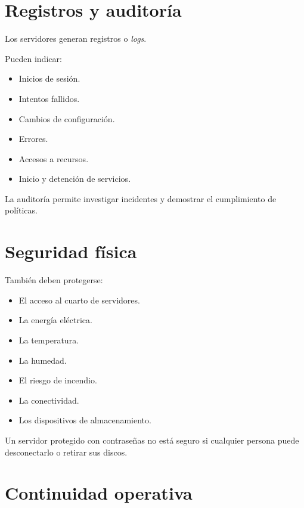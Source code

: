 \documentclass[
  spanish,
  letterpaper,
]{scrbook}
\providecommand{\tightlist}{%
  \setlength{\itemsep}{0pt}\setlength{\parskip}{0pt}}
\begin{document}
\chapter{Registros y auditoría}\label{registros-y-auditoruxeda}

Los servidores generan registros o \emph{logs}.

Pueden indicar:

\begin{itemize}
\tightlist
\item
  Inicios de sesión.
\item
  Intentos fallidos.
\item
  Cambios de configuración.
\item
  Errores.
\item
  Accesos a recursos.
\item
  Inicio y detención de servicios.
\end{itemize}

La auditoría permite investigar incidentes y demostrar el cumplimiento
de políticas.


\chapter{Seguridad física}\label{seguridad-fuxedsica}

También deben protegerse:

\begin{itemize}
\tightlist
\item
  El acceso al cuarto de servidores.
\item
  La energía eléctrica.
\item
  La temperatura.
\item
  La humedad.
\item
  El riesgo de incendio.
\item
  La conectividad.
\item
  Los dispositivos de almacenamiento.
\end{itemize}

Un servidor protegido con contraseñas no está seguro si cualquier
persona puede desconectarlo o retirar sus discos.


\chapter{Continuidad operativa}\label{continuidad-operativa}
\end{document}
